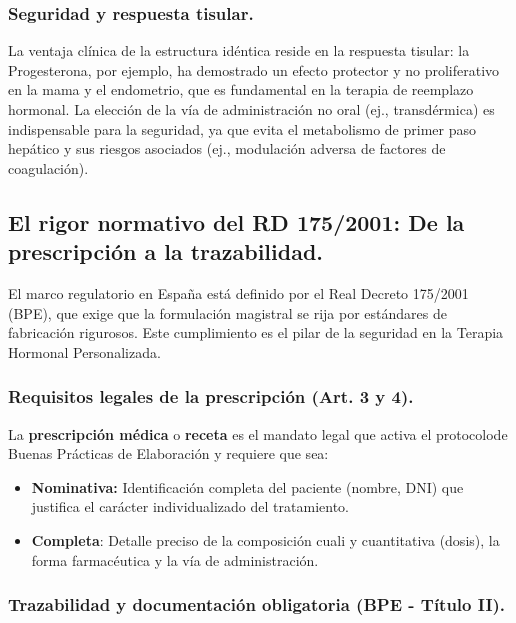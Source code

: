 \documentclass[
  spanish,
]{article}
\begin{document}
\subsubsection{Seguridad y respuesta tisular.}\label{seguridad-y-respuesta-tisular.}

La ventaja clínica de la estructura idéntica reside en la respuesta tisular: la Progesterona, por ejemplo, ha demostrado un efecto protector y no proliferativo en la mama y el endometrio, que es fundamental en la terapia de reemplazo hormonal. La elección de la vía de administración no oral (ej., transdérmica) es indispensable para la seguridad, ya que evita el metabolismo de primer paso hepático y sus riesgos asociados (ej., modulación adversa de factores de coagulación).

\subsection{El rigor normativo del RD 175/2001: De la prescripción a la trazabilidad.}\label{el-rigor-normativo-del-rd-1752001-de-la-prescripciuxf3n-a-la-trazabilidad.}

El marco regulatorio en España está definido por el Real Decreto 175/2001 (BPE), que exige que la formulación magistral se rija por estándares de fabricación rigurosos. Este cumplimiento es el pilar de la seguridad en la Terapia Hormonal Personalizada.

\subsubsection{Requisitos legales de la prescripción (Art. 3 y 4).}\label{requisitos-legales-de-la-prescripciuxf3n-art.-3-y-4.}

La \textbf{prescripción médica} o \textbf{receta} es el mandato legal que activa el protocolode Buenas Prácticas de Elaboración y requiere que sea:

\begin{itemize}
\item
  \textbf{Nominativa:} Identificación completa del paciente (nombre, DNI) que justifica el carácter individualizado del tratamiento.
\item
  \textbf{Completa}: Detalle preciso de la composición cuali y cuantitativa (dosis), la forma farmacéutica y la vía de administración.
\end{itemize}

\subsubsection{Trazabilidad y documentación obligatoria (BPE - Título II).}\label{trazabilidad-y-documentaciuxf3n-obligatoria-bpe---tuxedtulo-ii.}
\end{document}
